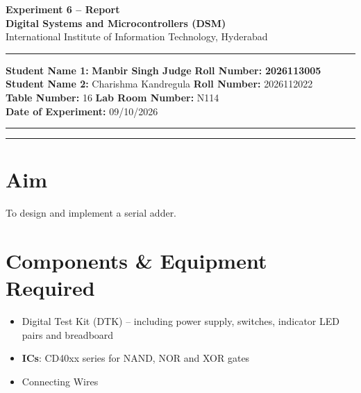 \documentclass[11pt, a4paper]{article}
\begin{document}
\thispagestyle{no_hdr_border_rule}

\begin{center}
    {\Large \textbf{Experiment 6 -- Report}} \\[0.2cm]
    {\large \textbf{Digital Systems and Microcontrollers (DSM)}} \\[0.1cm]
    {\normalsize International Institute of Information Technology, Hyderabad} \\[0.3cm]
\end{center}

\vspace{0.2cm}
\hrule
\vspace{0.4cm}

\noindent \textbf{Student Name 1:} \textbf{Manbir Singh Judge} \hfill \textbf{Roll Number:} \textbf{2026113005} \\
\noindent \textbf{Student Name 2:} Charishma Kandregula \hfill \textbf{Roll Number:} 2026112022 \\
\noindent \textbf{Table Number:} 16 \hfill \textbf{Lab Room Number:} N114 \\
\noindent \textbf{Date of Experiment:} 09/10/2026

\vspace{0.4cm}
\hrule
\vspace{0.5cm}

\vspace{1em}

\tableofcontents
\vspace{0.5cm}
\hrule
\vspace{0.8cm}

\newpage
{}


\section{Aim}
To design and implement a serial adder.

\section{Components \& Equipment Required}
\begin{itemize}
    \item Digital Test Kit (DTK) -- including power supply, switches, indicator LED pairs and breadboard
    \item \textbf{ICs}: CD40xx series for NAND, NOR and XOR gates
    \item Connecting Wires
\end{itemize}
\end{document}
